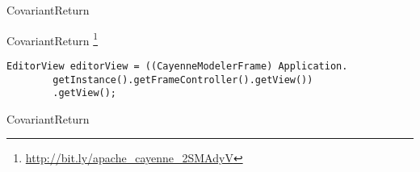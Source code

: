 \begin{pattern}{CovariantReturn}

\instances{}
CovariantReturn
\footnote{\url{http://bit.ly/apache_cayenne_2SMAdyV}}

\begin{verbatim}
EditorView editorView = ((CayenneModelerFrame) Application.
        getInstance().getFrameController().getView())
        .getView();
\end{verbatim}

\detection{}
    
\discussion{}
    
\related{} 

\end{pattern}{CovariantReturn}